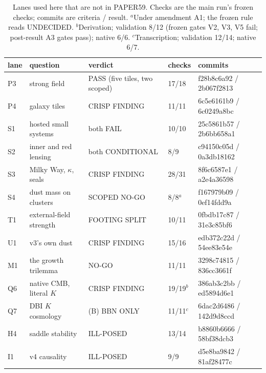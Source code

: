 \documentclass[10pt]{article}
\begin{document}
\begin{table}[t]\centering\small
\caption{Lanes used here that are not in PAPER59. Checks are the main run's frozen checks; commits are criteria / result. $^a$Under amendment A1; the frozen rule reads UNDECIDED. $^b$Derivation; validation 8/12 (frozen gates V2, V3, V5 fail; post-result A3 gates pass); native 6/6. $^c$Transcription; validation 12/14; native 6/7.}\label{tab:lanes}
\begin{tabular}{lllll}
\toprule
lane & question & verdict & checks & commits\\
\midrule
P3 & strong field & PASS (five tiles, two scoped) & 17/18 & f28b8c6a92 / 2b067f2813\\
P4 & galaxy tiles & CRISP FINDING & 11/11 & 6c5e6161b9 / 6c0249a8bc\\
S1 & hosted small systems & both FAIL & 10/10 & 25c5861b57 / 2b6bb658a1\\
S2 & inner and red lensing & both CONDITIONAL & 8/9 & c94150c05d / 0a3db18162\\
S3 & Milky Way, $\kappa$, seals & CRISP FINDING & 28/31 & 8f6c6587e1 / a2e4a36598\\
S4 & dust mass on clusters & SCOPED NO-GO & 8/8$^a$ & f167979b09 / 0ef14fdd9a\\
T1 & external-field strength & FOOTING SPLIT & 10/11 & 0fbdb17c87 / 31e3c85bf6\\
U1 & v3's own dust & CRISP FINDING & 15/16 & edb372c22d / 54ee83e54e\\
M1 & the growth trilemma & NO-GO & 11/11 & 3298c74815 / 836cc3661f\\
Q6 & native CMB, literal $K$ & CRISP FINDING & 19/19$^b$ & 386ab3c2bb / ed5894d6e1\\
Q7 & DBI $K$ cosmology & (B) BBN ONLY & 11/11$^c$ & 6dac2d6486 / 142d9d8ccd\\
H4 & saddle stability & ILL-POSED & 13/14 & b8860b6666 / 58bf38dcb3\\
I1 & v4 causality & ILL-POSED & 9/9 & d5e8ba9842 / 81af28477c\\
\bottomrule
\end{tabular}
\end{table}
\end{document}
